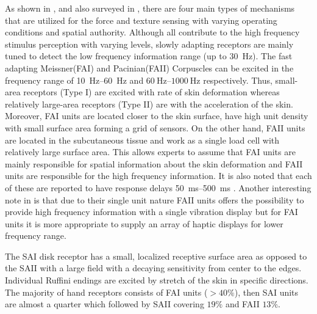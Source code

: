 As shown in , and also surveyed in \cite{kontarinis}, there are four main types of mechanisms that are utilized for the force and texture sensing with varying operating conditions and spatial authority. Although all contribute to the high frequency stimulus perception with varying levels, slowly adapting receptors are mainly tuned to detect the low frequency information range (up to \SI{30}{\hertz}). The fast adapting Meissner(FAI) and Pacinian(FAII) Corpuscles can be excited in the frequency range of \SIrange{10}{60}{\hertz} and $\SIrange{60}{1000}{\hertz}$ respectively. Thus, small-area receptors (Type I) are excited with rate of skin deformation whereas relatively large-area receptors (Type II) are with the acceleration of the skin. Moreover, FAI units are located closer to the skin surface, have high unit density with small surface area forming a grid of sensors. On the other hand, FAII units are located in the subcutaneous tissue and work as a single load cell with relatively large surface area. This allows experts to assume that FAI units are mainly responsible for spatial information about the skin deformation and FAII units are responsible for the high frequency information. It is also noted that each of these are reported to have response delays \SIrange{50}{500}{\milli\second} \cite{idareview}. Another interesting note in \cite{kontarinis} is that due to their single unit nature FAII units offers the possibility to provide high frequency information with a single vibration display but for FAI units it is more appropriate to supply an array of haptic displays for lower frequency range.  

The SAI disk receptor has a small, localized receptive surface area as opposed to the SAII with a large field with a decaying sensitivity from center to the edges. Individual Ruffini endings are excited by stretch of the skin in specific directions. The majority of hand receptors consists of FAI units ($>40\%$), then SAI units are almost a quarter which followed by SAII covering $19\%$ and FAII $13\%$. 



